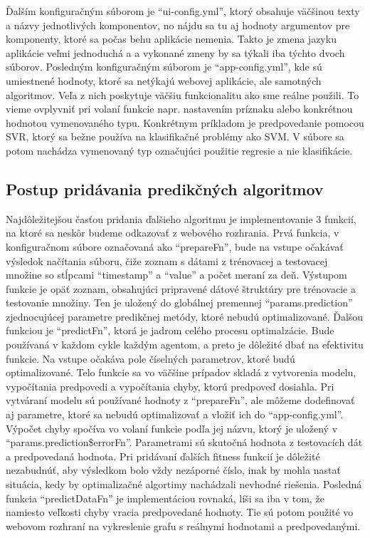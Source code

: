 \documentclass[a4paper,slovak,12pt,appendix]{article}
\begin{document}
Ďalším konfiguračným súborom je ``ui-config.yml'', ktorý obsahuje väčšinou
texty a názvy jednotlivých komponentov, no nájdu sa tu aj hodnoty argumentov
pre komponenty, ktoré sa počas behu aplikácie nemenia. Takto je zmena jazyku
aplikácie veľmi jednoduchá a a vykonané zmeny by sa týkali iba týchto dvoch
súborov. Posledným konfiguračným súborom je ``app-config.yml'', kde sú
umiestnené hodnoty, ktoré sa netýkajú webovej aplikácie, ale samotných
algoritmov. Veľa z nich poskytuje väčšiu funkcionalitu ako sme reálne použili.
To vieme ovplyvniť pri volaní funkcie napr. nastavením príznaku alebo
konkrétnou hodnotou vymenovaného typu. Konkrétnym príkladom je predpovedanie
pomocou SVR, ktorý sa bežne používa na klasifikačné problémy ako SVM. V súbore
sa potom nachádza vymenovaný typ označujúci použitie regresie a nie klasifikácie.


\subsection{Postup pridávania predikčných algoritmov}
Najdôležitejšou časťou pridania ďalšieho algoritmu je implementovanie 3 funkcií,
na ktoré sa neskôr budeme odkazovať z webového rozhrania. Prvá funkcia,
v konfiguračnom súbore označovaná ako ``prepareFn'', bude na vstupe očakávať
výsledok načítania súboru, čiže zoznam s dátami z trénovacej a testovacej
množine so stĺpcami ``timestamp'' a ``value'' a počet meraní za deň. Výstupom
funkcie je opäť zoznam, obsahujúci pripravené dátové štruktúry pre trénovacie
a testovanie množiny. Ten je uložený do globálnej premennej
``params.prediction'' zjednocujúcej parametre predikčnej metódy, ktoré nebudú
optimalizované. Ďalšou funkciou je ``predictFn'', ktorá je jadrom celého procesu
optimalzácie. Bude používaná v každom cykle každým agentom, a preto je dôležité
dbať na efektivitu funkcie. Na vstupe očakáva pole číselných parametrov, ktoré
budú optimalizované. Telo funkcie sa vo väčšine prípadov skladá z vytvorenia
modelu, vypočítania predpovedi a vypočítania chyby, ktorú predpoveď dosiahla.
Pri vytváraní modelu sú používané hodnoty z ``prepareFn'', ale môžeme
dodefinovať aj parametre, ktoré sa nebudú optimalizovať a vložiť ich do
``app-config.yml''. Výpočet chyby spočíva vo volaní funkcie podľa jej názvu,
ktorý je uložený v ``params.prediction\$errorFn''. Parametrami sú skutočná
hodnota z testovacích dát a predpovedaná hodnota. Pri pridávaní ďalších fitness
funkcií je dôležité nezabudnúť, aby výsledkom bolo vždy nezáporné číslo, inak by
mohla nastať situácia, kedy by optimalizačné algortimy nachádzali nevhodné
riešenia. Posledná funkcia ``predictDataFn'' je implementáciou rovnaká, líši sa
iba v tom, že namiesto veľkosti chyby vracia predpovedané hodnoty. Tie sú potom
použité vo webovom rozhraní na vykreslenie grafu s reálnymi hodnotami a
predpovedanými.
\end{document}
